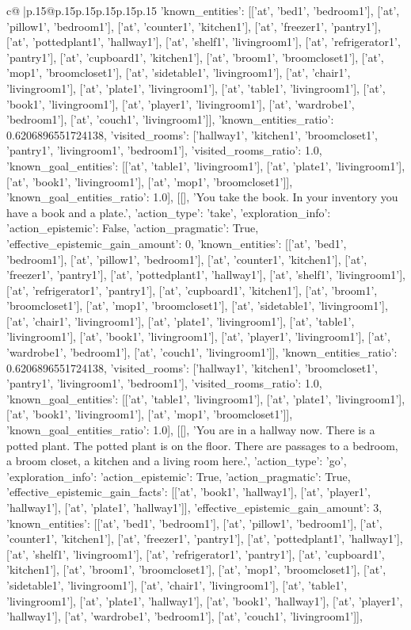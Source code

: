 \documentclass{article}
\begin{document}
{\begin{supertabular}{c@{$\;$}|p{.15\linewidth}@{}p{.15\linewidth}p{.15\linewidth}p{.15\linewidth}p{.15\linewidth}p{.15\linewidth}}
{{{'known_entities': [['at', 'bed1', 'bedroom1'], ['at', 'pillow1', 'bedroom1'], ['at', 'counter1', 'kitchen1'], ['at', 'freezer1', 'pantry1'], ['at', 'pottedplant1', 'hallway1'], ['at', 'shelf1', 'livingroom1'], ['at', 'refrigerator1', 'pantry1'], ['at', 'cupboard1', 'kitchen1'], ['at', 'broom1', 'broomcloset1'], ['at', 'mop1', 'broomcloset1'], ['at', 'sidetable1', 'livingroom1'], ['at', 'chair1', 'livingroom1'], ['at', 'plate1', 'livingroom1'], ['at', 'table1', 'livingroom1'], ['at', 'book1', 'livingroom1'], ['at', 'player1', 'livingroom1'], ['at', 'wardrobe1', 'bedroom1'], ['at', 'couch1', 'livingroom1']], 'known_entities_ratio': 0.6206896551724138, 'visited_rooms': ['hallway1', 'kitchen1', 'broomcloset1', 'pantry1', 'livingroom1', 'bedroom1'], 'visited_rooms_ratio': 1.0, 'known_goal_entities': [['at', 'table1', 'livingroom1'], ['at', 'plate1', 'livingroom1'], ['at', 'book1', 'livingroom1'], ['at', 'mop1', 'broomcloset1']], 'known_goal_entities_ratio': 1.0}}], [[], 'You take the book. In your inventory you have a book and a plate.', {'action_type': 'take', 'exploration_info': {'action_epistemic': False, 'action_pragmatic': True, 'effective_epistemic_gain_amount': 0, 'known_entities': [['at', 'bed1', 'bedroom1'], ['at', 'pillow1', 'bedroom1'], ['at', 'counter1', 'kitchen1'], ['at', 'freezer1', 'pantry1'], ['at', 'pottedplant1', 'hallway1'], ['at', 'shelf1', 'livingroom1'], ['at', 'refrigerator1', 'pantry1'], ['at', 'cupboard1', 'kitchen1'], ['at', 'broom1', 'broomcloset1'], ['at', 'mop1', 'broomcloset1'], ['at', 'sidetable1', 'livingroom1'], ['at', 'chair1', 'livingroom1'], ['at', 'plate1', 'livingroom1'], ['at', 'table1', 'livingroom1'], ['at', 'book1', 'livingroom1'], ['at', 'player1', 'livingroom1'], ['at', 'wardrobe1', 'bedroom1'], ['at', 'couch1', 'livingroom1']], 'known_entities_ratio': 0.6206896551724138, 'visited_rooms': ['hallway1', 'kitchen1', 'broomcloset1', 'pantry1', 'livingroom1', 'bedroom1'], 'visited_rooms_ratio': 1.0, 'known_goal_entities': [['at', 'table1', 'livingroom1'], ['at', 'plate1', 'livingroom1'], ['at', 'book1', 'livingroom1'], ['at', 'mop1', 'broomcloset1']], 'known_goal_entities_ratio': 1.0}}], [[], 'You are in a hallway now. There is a potted plant. The potted plant is on the floor. There are passages to a bedroom, a broom closet, a kitchen and a living room here.', {'action_type': 'go', 'exploration_info': {'action_epistemic': True, 'action_pragmatic': True, 'effective_epistemic_gain_facts': [['at', 'book1', 'hallway1'], ['at', 'player1', 'hallway1'], ['at', 'plate1', 'hallway1']], 'effective_epistemic_gain_amount': 3, 'known_entities': [['at', 'bed1', 'bedroom1'], ['at', 'pillow1', 'bedroom1'], ['at', 'counter1', 'kitchen1'], ['at', 'freezer1', 'pantry1'], ['at', 'pottedplant1', 'hallway1'], ['at', 'shelf1', 'livingroom1'], ['at', 'refrigerator1', 'pantry1'], ['at', 'cupboard1', 'kitchen1'], ['at', 'broom1', 'broomcloset1'], ['at', 'mop1', 'broomcloset1'], ['at', 'sidetable1', 'livingroom1'], ['at', 'chair1', 'livingroom1'], ['at', 'table1', 'livingroom1'], ['at', 'plate1', 'hallway1'], ['at', 'book1', 'hallway1'], ['at', 'player1', 'hallway1'], ['at', 'wardrobe1', 'bedroom1'], ['at', 'couch1', 'livingroom1']], }}}
\end{supertabular}}
\end{document}
